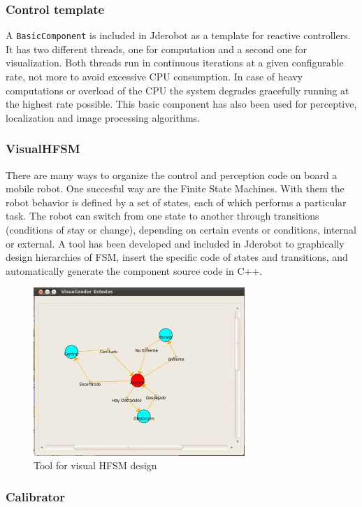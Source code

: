 \documentclass[twocolumn]{svjour3}          %
\begin{document}
\subsubsection{Control template}

A \texttt{BasicComponent} is included in Jderobot as a template for reactive controllers. It has two different threads, one for computation and a second one for visualization. Both threads run in continuous iterations at a given configurable rate, not more to avoid excessive CPU consumption. In case of heavy computations or overload of the CPU the system degrades gracefully running at the highest rate possible. This basic component has also been used for perceptive, localization and image processing algorithms.

\subsubsection{VisualHFSM}

There are many ways to organize the control and perception code on board a mobile robot. One succesful way are the Finite State Machines. With them the robot behavior is defined by a set of states, each of which performs a particular task. The robot can switch from one state to another through transitions (conditions of stay or change), depending on certain events or conditions, internal or external. A tool has been developed and included in Jderobot to graphically design hierarchies of FSM, insert the specific code of states and transitions, and automatically generate the component source code in C++.

\begin{figure}[h!]
  \includegraphics[width=8cm]{ratonGatoAutoEjec.jpg}
\caption{Tool for visual HFSM design}
\label{fig:visualHFSM}
\end{figure}

\subsubsection{Calibrator}
\end{document}
